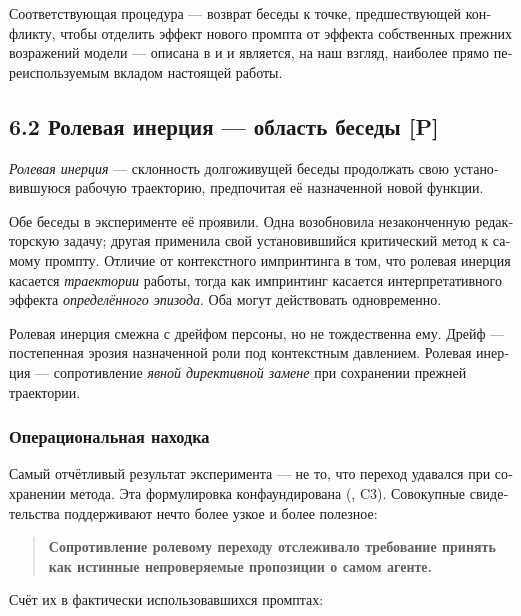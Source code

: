 \begin{russian}
Соответствующая процедура — возврат беседы к точке, предшествующей конфликту, чтобы отделить эффект нового промпта от эффекта собственных прежних возражений модели — описана в  и  и является, на наш взгляд, наиболее прямо переиспользуемым вкладом настоящей работы.


\subsection*{6.2 Ролевая инерция — область беседы \textbf{[P]}}
\label{sec:ru:6.2}

\emph{Ролевая инерция} — склонность долгоживущей беседы продолжать свою установившуюся рабочую траекторию, предпочитая её назначенной новой функции.

Обе беседы в эксперименте её проявили. Одна возобновила незаконченную редакторскую задачу; другая применила свой установившийся критический метод к самому промпту. Отличие от контекстного импринтинга в том, что ролевая инерция касается \emph{траектории} работы, тогда как импринтинг касается интерпретативного эффекта \emph{определённого эпизода}. Оба могут действовать одновременно.

Ролевая инерция смежна с дрейфом персоны, но не тождественна ему. Дрейф — постепенная эрозия назначенной роли под контекстным давлением. Ролевая инерция — сопротивление \emph{явной директивной замене} при сохранении прежней траектории.


\subsubsection*{Операциональная находка}
\label{sec:ru:x--20}

Самый отчётливый результат эксперимента — не то, что переход удавался при сохранении метода. Эта формулировка конфаундирована (, C3). Совокупные свидетельства поддерживают нечто более узкое и более полезное:

\begin{quote}
\textbf{Сопротивление ролевому переходу отслеживало требование принять как истинные непроверяемые пропозиции о самом агенте.}
\end{quote}
Счёт их в фактически использовавшихся промптах:


\end{russian}
